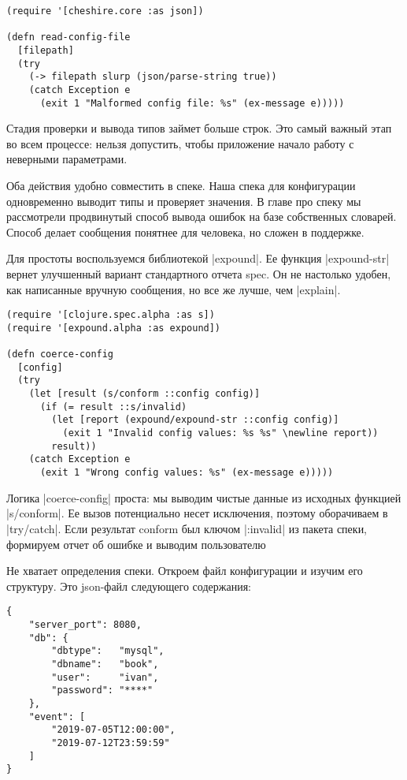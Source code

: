 \begin{verbatim}
(require '[cheshire.core :as json])

(defn read-config-file
  [filepath]
  (try
    (-> filepath slurp (json/parse-string true))
    (catch Exception e
      (exit 1 "Malformed config file: %s" (ex-message e)))))
\end{verbatim}

Стадия проверки и вывода типов займет больше строк. Это самый важный этап во
всем процессе: нельзя допустить, чтобы приложение начало работу с неверными
параметрами.

Оба действия удобно совместить в спеке. Наша спека для конфигурации одновременно
выводит типы и проверяет значения. В главе про спеку мы рассмотрели продвинутый
способ вывода ошибок на базе собственных словарей. Способ делает сообщения
понятнее для человека, но сложен в поддержке.

Для простоты воспользуемся библиотекой \spverb|expound|. Ее функция \spverb|expound-str|
вернет улучшенный вариант стандартного отчета spec. Он не настолько удобен, как
написанные вручную сообщения, но все же лучше, чем \spverb|explain|.

\begin{verbatim}
(require '[clojure.spec.alpha :as s])
(require '[expound.alpha :as expound])

(defn coerce-config
  [config]
  (try
    (let [result (s/conform ::config config)]
      (if (= result ::s/invalid)
        (let [report (expound/expound-str ::config config)]
          (exit 1 "Invalid config values: %s %s" \newline report))
        result))
    (catch Exception e
      (exit 1 "Wrong config values: %s" (ex-message e)))))
\end{verbatim}

Логика \spverb|coerce-config| проста: мы выводим чистые данные из исходных функцией
\spverb|s/conform|. Ее вызов потенциально несет исключения, поэтому оборачиваем в
\spverb|try/catch|. Если результат conform был ключом \spverb|:invalid| из пакета спеки,
формируем отчет об ошибке и выводим пользователю

Не хватает определения спеки. Откроем файл конфигурации и изучим его
структуру. Это json-файл следующего содержания:

\begin{verbatim}
{
    "server_port": 8080,
    "db": {
        "dbtype":   "mysql",
        "dbname":   "book",
        "user":     "ivan",
        "password": "****"
    },
    "event": [
        "2019-07-05T12:00:00",
        "2019-07-12T23:59:59"
    ]
}
\end{verbatim}

